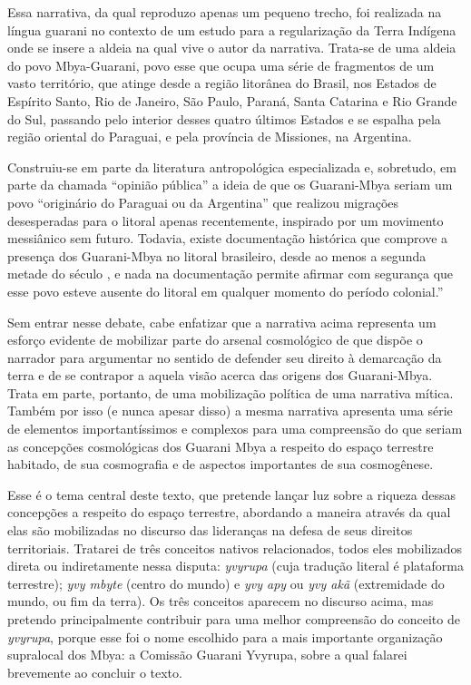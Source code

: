 \bigskip
\bigskip
Essa narrativa, da qual reproduzo apenas um pequeno trecho, foi
realizada na língua guarani no contexto de um estudo para a
regularização da Terra Indígena onde se insere a aldeia na qual vive o
autor da narrativa. Trata-se de uma aldeia do povo Mbya-Guarani, povo
esse que ocupa uma série de fragmentos de um vasto território, que
atinge desde a região litorânea do Brasil, nos Estados de Espírito
Santo, Rio de Janeiro, São Paulo, Paraná, Santa Catarina e Rio Grande
do Sul, passando pelo interior desses quatro últimos Estados e se
espalha pela região oriental do Paraguai, e pela província de
Missiones, na Argentina.

Construiu-se em parte da literatura antropológica especializada e,
sobretudo, em parte da chamada ``opinião pública'' a ideia de que os
Guarani-Mbya seriam um povo ``originário do Paraguai ou da Argentina''
que realizou migrações desesperadas para o litoral apenas recentemente,
inspirado por um movimento messiânico sem futuro. Todavia, existe
documentação histórica que comprove a presença dos Guarani-Mbya no
litoral brasileiro, desde ao menos a segunda metade do século , e
nada na documentação permite afirmar com segurança que esse povo esteve
ausente do litoral em qualquer momento do período colonial.''

Sem entrar nesse debate, cabe enfatizar que a narrativa acima representa
um esforço evidente de mobilizar parte do arsenal cosmológico de que
dispõe o narrador para argumentar no sentido de defender seu direito à
demarcação da terra e de se contrapor a aquela visão acerca das origens
dos Guarani-Mbya. Trata em parte, portanto, de uma mobilização política
de uma narrativa mítica. Também por isso (e nunca apesar disso) a mesma
narrativa apresenta uma série de elementos importantíssimos e complexos
para uma compreensão do que seriam as concepções cosmológicas dos
Guarani Mbya a respeito do espaço terrestre habitado, de sua
cosmografia e de aspectos importantes de sua cosmogênese.

Esse é o tema central deste texto, que pretende lançar luz sobre a
riqueza dessas concepções a respeito do  espaço terrestre,  abordando a
maneira através da qual elas são mobilizadas no discurso das lideranças
na defesa de seus direitos territoriais. Tratarei de três conceitos
nativos relacionados, todos eles mobilizados direta ou indiretamente
nessa disputa: \emph{yvyrupa} (cuja tradução literal é plataforma terrestre);
\emph{yvy mbyte} (centro do mundo) e \emph{yvy apy} ou \emph{yvy akã} (extremidade do mundo,
ou fim da terra). Os três conceitos aparecem no discurso acima, mas
pretendo principalmente contribuir para uma melhor compreensão do
conceito de \emph{yvyrupa}, porque esse foi o nome escolhido para a mais
importante organização supralocal dos Mbya: a Comissão Guarani Yvyrupa,
sobre a qual falarei brevemente ao concluir o texto.

